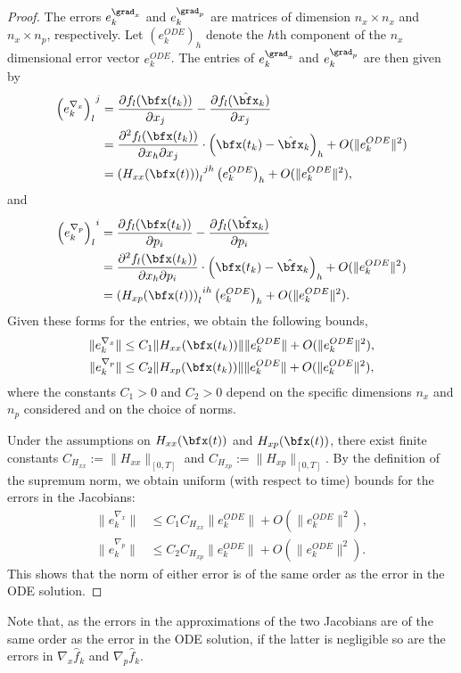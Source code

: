 \documentclass[DIV=12]{scrartcl} %
\newcommand{\err}{\ensuremath{e}}
\theoremstyle{definition}
\begin{document}
\begin{proof}
The errors $\err_k ^{\grad _x}$ and $\err _k ^{\grad _p}$ are matrices of dimension $n_x \times n_x$ and $n_x \times n_p$, respectively. Let $\left(\err_{k}^{ODE}\right)_h$ denote the $h$th component of the $n_x$ dimensional error vector $\err_k^{ODE}$. The entries of $\err_k ^{\grad _x}$ and $\err _k ^{\grad _p}$ are then given by
\begin{align*}
    \left(\err_k^{\nabla_x}\right)_{l}^{~j} &=\frac{\partial f_{l}(\bfx(t_k))}{\partial x_j} - \frac{\partial f_{l}(\hat{\bfx}_k)}{\partial x_j}\\
    &=\frac{\partial^2f_{l}(\bfx(t_k))}{\partial x_h\partial x_j}\cdot \left(\bfx(t_k)-\hat{\bfx}_{k}\right)_h+O(\|\err_{k}^{ODE}\|^2)\\
    &=\left(H_{xx}(\bfx(t))\right)^{~jh}_l\left(\err_{k}^{ODE}\right)_h+O(\|\err_{k}^{ODE}\|^2),
\end{align*}
and
\begin{align*}
    \left(\err_k^{\nabla_p}\right)_{l}^{~i} &= \frac{\partial f_{l}(\bfx(t_k))}{\partial p_i} - \frac{\partial f_{l}(\hat{\bfx}_k)}{\partial p_i}\\
    &=\frac{\partial^2f_{l}(\bfx(t_k))}{\partial x_h\partial p_i}\cdot \left(\bfx(t_k)-\hat{\bfx}_{k}\right)_h+O(\|\err_{k}^{ODE}\|^2)\\
    &=\left(H_{xp}(\bfx(t))\right)^{~ih}_l\left(\err_{k}^{ODE}\right)_h+O(\|\err_{k}^{ODE}\|^2).
\end{align*}
Given these forms for the entries, we obtain the following bounds,
\begin{align*}
    \|\err_k^{\nabla_x}\| &\le C_1 \|H_{xx}(\bfx(t_k))\|\|\err_k^{ODE}\|+O(\|\err_k^{ODE}\|^2),\\
    \|\err_k^{\nabla_p}\| &\le C_2 \|H_{xp}(\bfx(t_k))\|\|\err_k^{ODE}\|+O(\|\err_k^{ODE}\|^2),
\end{align*}
where the constants $C_1>0$ and $C_2>0$ depend on the specific dimensions $n_x$ and $n_p$ considered and on the choice of norms. 

Under the assumptions on $H_{xx}(\bfx (t))$ and $H_{xp} (\bfx (t))$, there exist finite constants $C_{H_{xx}}:=\|H_{xx}\|_{[0,T]}$ and $C_{H_{xp}}:=\|H_{xp}\|_{[0,T]}$. By the definition of the supremum norm, we obtain uniform (with respect to time) bounds for the errors in the Jacobians:
\begin{align*}
    \|\err_k^{\nabla_x}\| &\le C_1C_{H_{xx}}\|\err_k^{ODE}\|+O(\|\err_k^{ODE}\|^2),\\
    \|\err_k^{\nabla_p}\| &\le  C_2C_{H_{xp}}\|\err_k^{ODE}\|+O(\|\err_k^{ODE}\|^2).
\end{align*}
This shows that the norm of either error is of the same order as the error in the ODE solution. 
\end{proof}
Note that, as the errors in the approximations of the two Jacobians are of the same order as the error in the ODE solution, if the latter is negligible so are the errors in $\nabla _x \hat f_k$ and $\nabla _p \hat f_k$.
\end{document}
